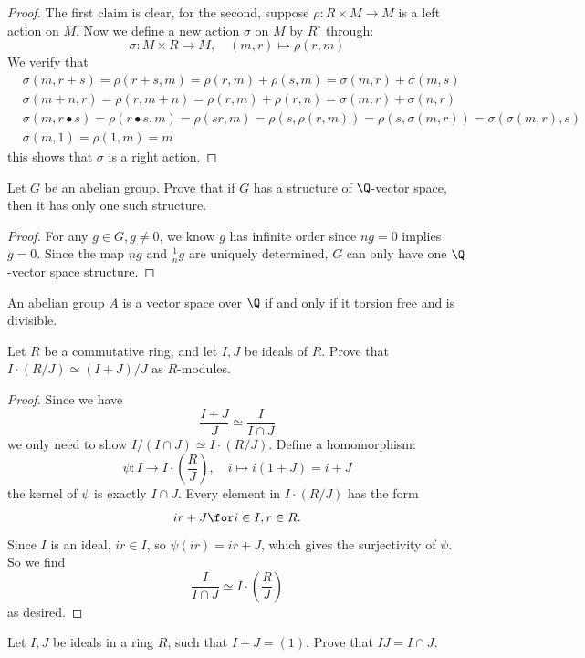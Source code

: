\begin{proof}
The first claim is clear, for the second, suppose $\rho:R\times M\to M$ is a left action on $M$. Now we define a new action $\sigma$ on $M$ by $R^{\circ}$ through:
\[\sigma:M\times R\to M,\quad (m,r)\mapsto \rho(r,m)\]
We verify that 
\begin{align*}
&\sigma(m,r+s)=\rho(r+s,m)=\rho(r,m)+\rho(s,m)=\sigma(m,r)+\sigma(m,s)\\ &\sigma(m+n,r)=\rho(r,m+n)=\rho(r,m)+\rho(r,n)=\sigma(m,r)+\sigma(n,r)\\
&\sigma(m,r\bullet s)=\rho(r\bullet s,m)=\rho(sr,m)=\rho(s,\rho(r,m))=\rho(s,\sigma(m,r))=\sigma(\sigma(m,r),s)\\
&\sigma(m,1)=\rho(1,m)=m
\end{align*}
this shows that $\sigma$ is a right action.
\end{proof}
\begin{exercise}
Let $G$ be an abelian group. Prove that if $G$ has a structure of $\Q$-vector space, then it has only one such structure.
\end{exercise}
\begin{proof}
For any $g\in G, g\neq 0$, we know $g$ has infinite order since $ng=0$ implies $g=0$. Since the map $ng$ and $\frac{1}{n}g$ are uniquely determined, $G$ can only have one $\Q$-vector space structure. 
\end{proof}
\begin{exercise}
An abelian group $A$ is a vector space over $\Q$ if and only if it torsion free and is divisible.
\end{exercise}
\begin{exercise}\label{ideal prod quotient}
Let $R$ be a commutative ring, and let $I,J$ be ideals of $R$. Prove that $I\cdot(R/J)\simeq(I+J)/J$ as $R$-modules.
\end{exercise}
\begin{proof}
Since we have 
\[\dfrac{I+J}{J}\simeq \dfrac{I}{I\cap J}\]
we only need to show $I/(I\cap J)\simeq I\cdot(R/J)$. Define a homomorphism:
\[\psi:I\to I\cdot(\dfrac{R}{J}),\quad i\mapsto i(1+J)=i+J\]
the kernel of $\psi$ is exactly $I\cap J$. Every element in $I\cdot(R/J)$ has the form
\[ir+J\for i\in I, r\in R.\]
Since $I$ is an ideal, $ir\in I$, so $\psi(ir)=ir+J$, which gives the surjectivity of $\psi$. So we find
\[\dfrac{I}{I\cap J}\simeq I\cdot(\dfrac{R}{J})\]
as desired.
\end{proof}
\begin{exercise}
Let $I,J$ be ideals in a ring $R$, such that $I+J=(1)$. Prove that $IJ=I\cap J$.
\end{exercise}
